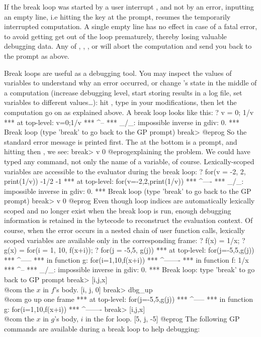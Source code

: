 If the break loop was started by a user interrupt , and not by
an error, inputting an empty line, i.e hitting the  key at the
 prompt, resumes the temporarily interrupted computation. A single
empty line has no effect in case of a fatal error, to avoid getting get out of
the loop prematurely, thereby losing valuable debugging data. Any of
, , , or  will abort the computation
and send you back to  the  prompt as above.

Break loops are useful as a debugging tool. You may inspect the values of
 variables to understand why an error occurred, or change
's state in the middle of a computation (increase debugging level,
start storing results in a log file, set variables to different values\dots):
hit , type in your modifications, then let the computation go on as
explained above. A break loop looks like this:
\bprog
? v = 0; 1/v
  ***   at top-level: v=0;1/v
  ***                      ^--
  *** _/_: impossible inverse in gdiv: 0.
  ***   Break loop (type 'break' to go back to the GP prompt)
break>
@eprog
\noindent So the standard error message is printed first. The
 at the bottom is a prompt, and hitting  then
, we see:
\bprog
break> v
0
@eprog\noindent explaining the problem. We could have typed any 
command, not only the name of a variable, of course. Lexically-scoped
variables are accessible to the evaluator during the break loop:
\bprog
? for(v = -2, 2, print(1/v))
-1/2
-1
  ***   at top-level: for(v=-2,2,print(1/v))
  ***                                   ^----
  *** _/_: impossible inverse in gdiv: 0.
  ***   Break loop (type 'break' to go back to the GP prompt)
break> v
0
@eprog\noindent
Even though loop indices are automatically lexically scoped and no longer
exist when the break loop is run, enough debugging information is retained in
the bytecode to reconstruct the evaluation context. Of course, when the error
occurs in a nested chain of user function calls, lexically scoped variables are
available only in the corresponding frame:
\bprog
? f(x) = 1/x;
? g(x) = for(i = 1, 10, f(x+i));
? for(j = -5,5, g(j))
  ***   at top-level: for(j=-5,5,g(j))
  ***                            ^-----
  ***   in function g: for(i=1,10,f(x+i))
  ***                             ^-------
  ***   in function f: 1/x
  ***                   ^--
  *** _/_: impossible inverse in gdiv: 0.
  ***   Break loop: type 'break' to go back to GP prompt
break> [i,j,x]     \\ @com the $x$ in $f$'s body.
[i, j, 0]
break> dbg_up      \\ @com go up one frame
  ***   at top-level: for(j=-5,5,g(j))
  ***                            ^-----
  ***   in function g: for(i=1,10,f(x+i))
  ***                             ^-------
break> [i,j,x]      \\ @com the $x$ in $g$'s body, $i$ in the for loop.
[5, j, -5]
@eprog
The following GP commands are available during a break loop to help debugging:


